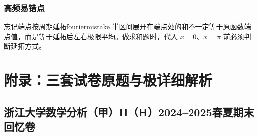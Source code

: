 \documentclass[UTF8,zihao=-4,openany]{ctexbook}
\begin{document}
\section{高频易错点}
\begin{mistake}{忘记端点按周期延拓}{fouriermistake}
半区间展开在端点处的和不一定等于原函数端点值，而是等于延拓后左右极限平均。做求和题时，代入 $x=0$、$x=\pi$ 前必须判断延拓方式。
\end{mistake}



\part{附录：三套试卷原题与极详细解析}
\appendix

\chapter{浙江大学数学分析（甲）II（H）2024--2025春夏期末回忆卷}
\end{document}
